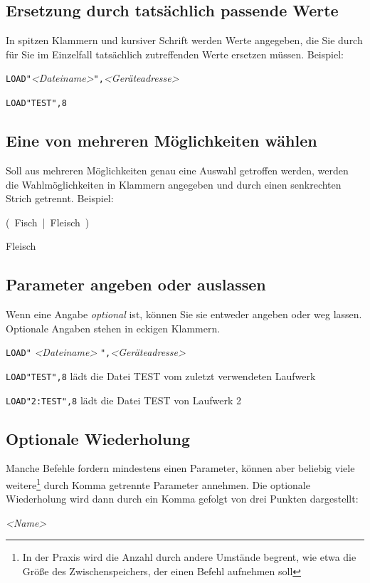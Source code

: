 \documentclass[10pt,a4paper]{scrartcl}		%
\begin{document}
\subsection*{Ersetzung durch tatsächlich passende Werte}
In spitzen Klammern und kursiver Schrift werden Werte angegeben, die 
Sie durch für Sie im Einzelfall tatsächlich
zutreffenden Werte ersetzen müssen. Beispiel:

\texttt{LOAD"}\textit{<Dateiname>}\texttt{",}\textit{<Geräteadresse>}

\texttt{LOAD"TEST",8}

\subsection*{Eine von mehreren Möglichkeiten wählen}
Soll aus mehreren Möglichkeiten genau eine Auswahl getroffen werden,
werden die Wahlmöglichkeiten in Klammern angegeben und durch einen
senkrechten Strich getrennt. Beispiel:

\mbox{\Big( Fisch \Big| \normalsize Fleisch \Big) \normalsize} 

Fleisch

\subsection*{Parameter angeben oder auslassen}
Wenn eine Angabe \textit{optional} ist, können Sie sie entweder
angeben oder weg lassen. Optionale Angaben stehen in eckigen Klammern.

\texttt{LOAD"}  \textit{<Dateiname>}
\texttt{",}\textit{<Geräteadresse>}

\texttt{LOAD"TEST",8} lädt die Datei TEST vom zuletzt 
verwendeten Laufwerk

\texttt{LOAD"2:TEST",8} lädt die Datei TEST von Laufwerk 2

\subsection*{Optionale Wiederholung}
Manche Befehle fordern mindestens einen Parameter, können aber beliebig
viele weitere\footnote{
	In der Praxis wird die Anzahl durch andere Umstände begrent, 
	wie etwa die Größe des Zwischenspeichers, der einen Befehl
	aufnehmen soll
} durch Komma getrennte Parameter annehmen. Die optionale Wiederholung
wird dann durch ein Komma gefolgt von drei Punkten dargestellt:

\mbox{\textit{<Name>} \Big[ \texttt{,} \ldots \ \Big]}
\end{document}
